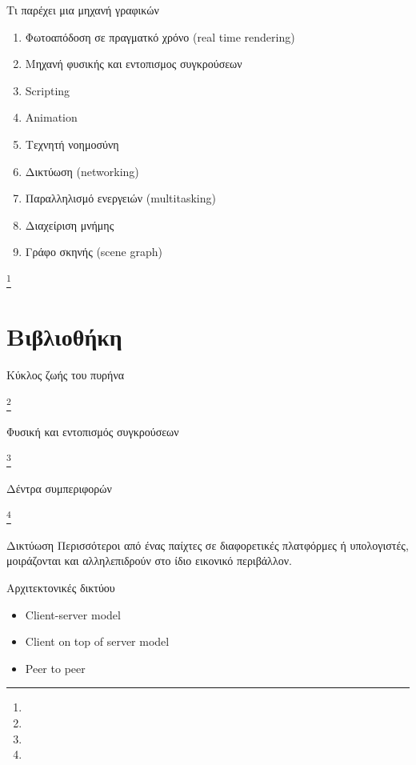 \documentclass{beamer}
\newcommand\blfootnote[1]{%
	\begingroup
	\renewcommand\thefootnote{}\footnote{#1}%
	\addtocounter{footnote}{-1}%
	\endgroup
}
\begin{document}
	\begin{frame}{Τι παρέχει μια μηχανή γραφικών}		
	\begin{enumerate}
		\item Φωτοαπόδοση σε πραγματκό χρόνο (real time rendering)
		\item Mηχανή φυσικής και εντοπισμος συγκρούσεων
		\item Scripting
		\item Animation
		\item Τεχνητή νοημοσύνη
		\item Δικτύωση (networking)
		\item Παραλληλισμό ενεργειών (multitasking)
		\item Διαχείριση μνήμης
		\item Γράφο σκηνής (scene graph)
	\end{enumerate}
	\blfootnote{}
	\end{frame}
		
	\section{Bιβλιοθήκη}
		
	\begin{frame}{Κύκλος ζωής του πυρήνα}
		\begin{figure}
			\centering
			\resizebox{4.8cm}{!}{}
		\end{figure}
		\blfootnote{}	
	\end{frame}

	\begin{frame}{Φυσική και εντοπισμός συγκρούσεων}
		\begin{figure}
			\centering
			\resizebox{10.5cm}{!}{}
		\end{figure}
		\blfootnote{}
	\end{frame}
	
	\begin{frame}{Δέντρα συμπεριφορών}
		\begin{figure}
			\centering
			\resizebox{10.5cm}{!}{}
		\end{figure}
		\blfootnote{}
	\end{frame}

	\begin{frame}{Δικτύωση}
		Περισσότεροι από ένας παίχτες σε διαφορετικές πλατφόρμες ή υπολογιστές, μοιράζονται και αλληλεπιδρούν στο ίδιο εικονικό περιβάλλον.
		
		\alert{Αρχιτεκτονικές δικτύου} 		
		\begin{itemize}
			\item Client-server model
			\item Client on top of server model
			\item Peer to peer
		\end{itemize}			
	
	\end{frame}
	
\end{document}
